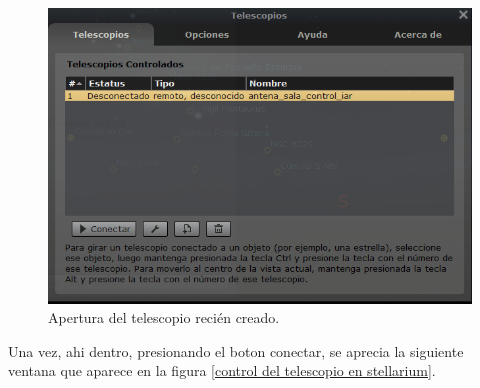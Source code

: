 \begin{figure}[ht!]
	\centering
	\includegraphics[scale=0.6]{rotador_stellarium} 
	\caption{Apertura del telescopio recién creado.}
	\label{fig:rotador_stellarium_conn}
\end{figure}
Una vez, ahi dentro, presionando el boton conectar, se aprecia la siguiente ventana que aparece en la figura \ref{control del telescopio en stellarium}.  

